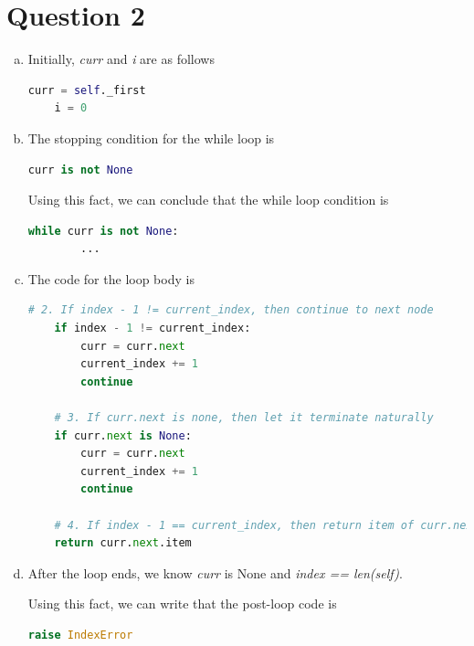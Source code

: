 \documentclass[12pt]{article}
\begin{document}
\section*{Question 2}
\begin{enumerate}[a.]
    \item

    Initially, \textit{curr} and \textit{i} are as follows

    \begin{lstlisting}[language=Python]
    curr = self._first
    i = 0
    \end{lstlisting}

    \item

    The stopping condition for the while loop is

    \begin{lstlisting}[language=Python]
    curr is not None
    \end{lstlisting}

    \bigskip

    Using this fact, we can conclude that the while loop condition is

    \begin{lstlisting}[language=Python]
    while curr is not None:
        ...
    \end{lstlisting}

    \item
    The code for the loop body is
    \begin{lstlisting}[language=Python]
    # 2. If index - 1 != current_index, then continue to next node
    if index - 1 != current_index:
        curr = curr.next
        current_index += 1
        continue

    # 3. If curr.next is none, then let it terminate naturally
    if curr.next is None:
        curr = curr.next
        current_index += 1
        continue

    # 4. If index - 1 == current_index, then return item of curr.next
    return curr.next.item
    \end{lstlisting}

    \item

    After the loop ends, we know \textit{curr} is None and \textit{index == len(self)}.

    \bigskip

    Using this fact, we can write that the post-loop code is

    \begin{lstlisting}[language=Python]
    raise IndexError
    \end{lstlisting}

\end{enumerate}
\end{document}
